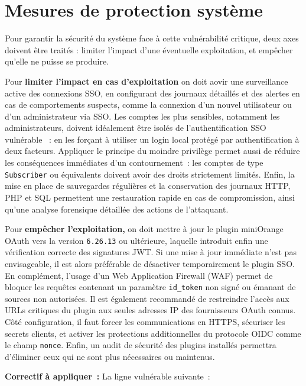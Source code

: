\documentclass[a4paper,12pt]{article}
\begin{document}
\section{Mesures de protection système}

Pour garantir la sécurité du système face à cette vulnérabilité critique, deux axes doivent être traités : limiter l'impact d'une éventuelle exploitation, et empêcher qu'elle ne puisse se produire.

\vspace{0.5em}
Pour \textbf{limiter l’impact en cas d’exploitation} on doit aovir une surveillance active des connexions SSO, en configurant des journaux détaillés et des alertes en cas de comportements suspects, comme la connexion d’un nouvel utilisateur ou d’un administrateur via SSO. Les comptes les plus sensibles, notamment les administrateurs, doivent idéalement être isolés de l’authentification SSO vulnérable ~: en les forçant à utiliser un login local protégé par authentification à deux facteurs. Appliquer le principe du moindre privilège permet aussi de réduire les conséquences immédiates d’un contournement~: les comptes de type \texttt{Subscriber} ou équivalents doivent avoir des droits strictement limités. Enfin, la mise en place de sauvegardes régulières et la conservation des journaux HTTP, PHP et SQL permettent une restauration rapide en cas de compromission, ainsi qu'une analyse forensique détaillée des actions de l’attaquant.

\vspace{0.5em}
Pour \textbf{empêcher l’exploitation,} on doit mettre à jour le plugin miniOrange OAuth vers la version \texttt{6.26.13} ou ultérieure, laquelle introduit enfin une vérification correcte des signatures JWT. Si une mise à jour immédiate n’est pas envisageable, il est alors préférable de désactiver temporairement le plugin SSO. En complément, l’usage d’un Web Application Firewall (WAF) permet de bloquer les requêtes contenant un paramètre \texttt{id\_token} non signé ou émanant de sources non autorisées. Il est également recommandé de restreindre l'accès aux URLs critiques du plugin aux seules adresses IP des fournisseurs OAuth connus. Côté configuration, il faut forcer les communications en HTTPS, sécuriser les secrets clients, et activer les protections additionnelles du protocole OIDC comme le champ \texttt{nonce}. Enfin, un audit de sécurité des plugins installés permettra d’éliminer ceux qui ne sont plus nécessaires ou maintenus.

\vspace{0.5em}
\textbf{Correctif à appliquer~:} La ligne vulnérable suivante~:
\end{document}

